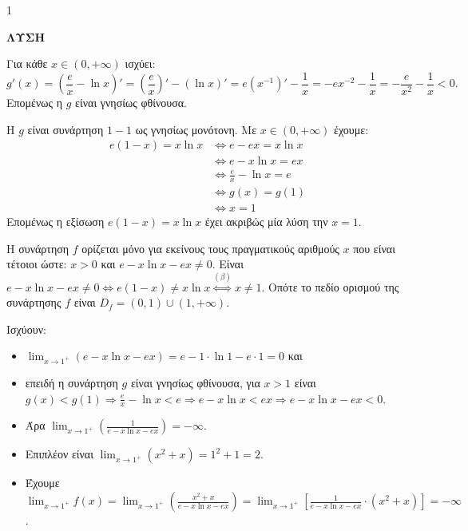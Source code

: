\begin{ylh}{1}
    \item [Ύλη από εικόνα]
\end{ylh}
\textbf{ΛΥΣΗ}

\begin{alist}
    \item [α)] Για κάθε $x \in (0, +\infty)$ ισχύει:
    \[ g'(x) = \left(\frac{e}{x} - \ln x\right)' = \left(\frac{e}{x}\right)' - (\ln x)' = e(x^{-1})' - \frac{1}{x} = -ex^{-2} - \frac{1}{x} = -\frac{e}{x^2} - \frac{1}{x} < 0. \]
    Επομένως η $g$ είναι γνησίως φθίνουσα.

    \item [β)] Η $g$ είναι συνάρτηση $1-1$ ως γνησίως μονότονη.
    Με $x \in (0, +\infty)$ έχουμε:
    \begin{align*}
        e(1-x) = x\ln x &\Leftrightarrow e - ex = x\ln x \\
        &\Leftrightarrow e - x\ln x = ex \\
        &\Leftrightarrow \frac{e}{x} - \ln x = e \\
        &\Leftrightarrow g(x) = g(1) \\
        &\Leftrightarrow x=1
    \end{align*}
    Επομένως η εξίσωση $e(1-x) = x\ln x$ έχει ακριβώς μία λύση την $x=1$.

    \item [γ)]
    \begin{rlist}
        \item Η συνάρτηση $f$ ορίζεται μόνο για εκείνους τους πραγματικούς αριθμούς $x$ που είναι τέτοιοι ώστε: $x>0$ και $e-x\ln x - ex \neq 0$.
        Είναι $e-x\ln x - ex \neq 0 \Leftrightarrow e(1-x) \neq x\ln x \overset{(\beta)}{\Leftrightarrow} x \neq 1$.
        Οπότε το πεδίο ορισμού της συνάρτησης $f$ είναι $D_f = (0,1)\cup(1,+\infty)$.

        \item Ισχύουν:
        \begin{itemize}
            \item $\lim_{x \to 1^+} (e-x\ln x - ex) = e - 1\cdot\ln 1 - e\cdot 1 = 0$ και
            \item επειδή η συνάρτηση $g$ είναι γνησίως φθίνουσα, για $x>1$ είναι $g(x) < g(1) \Rightarrow \frac{e}{x} - \ln x < e \Rightarrow e - x\ln x < ex \Rightarrow e - x\ln x - ex < 0$.
            \item Άρα $\lim_{x \to 1^+} \left(\frac{1}{e-x\ln x - ex}\right) = -\infty$.
            \item Επιπλέον είναι $\lim_{x \to 1^+} (x^2+x) = 1^2+1=2$.
            \item Έχουμε $\lim_{x \to 1^+} f(x) = \lim_{x \to 1^+} \left(\frac{x^2+x}{e-x\ln x - ex}\right) = \lim_{x \to 1^+} \left[ \frac{1}{e-x\ln x - ex} \cdot (x^2+x) \right] = -\infty$.
        \end{itemize}
    \end{rlist}
\end{alist}